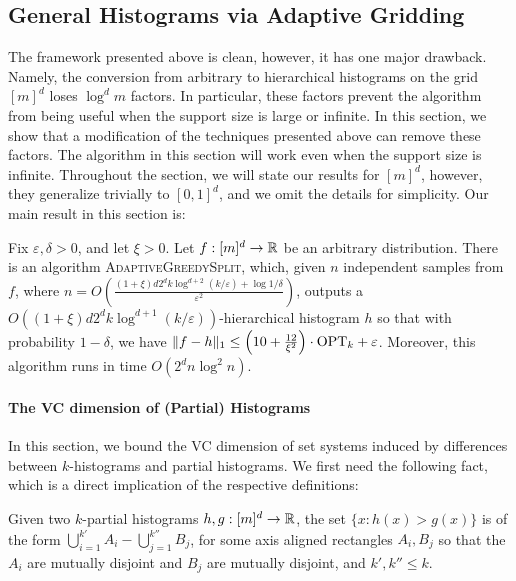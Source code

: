 \documentclass[final,12pt]{colt2018} %
\newcommand{\eps}{\varepsilon}
\begin{document}
\subsection{General Histograms via Adaptive Gridding}
The framework presented above is clean, however, it has one major drawback.
Namely, the conversion from arbitrary to hierarchical histograms on the grid $[m]^d$ loses $\log^d m$ factors. 
In particular, these factors prevent the algorithm from being useful when the support size is large or infinite.
In this section, we show that a modification of the techniques presented above can remove these factors.
The algorithm in this section will work even when the support size is infinite.
Throughout the section, we will state our results for $[m]^d$, however, they generalize trivially to $[0, 1]^d$, and we omit the details for simplicity.
Our main result in this section is:
\begin{theorem}
\label{thm:adaptive-main}
Fix $\eps, \delta > 0$, and let $\xi > 0$.
Let $f: [m]^d \to \operatorname{\mathbb{R}}$ be an arbitrary distribution.
There is an algorithm \textsc{AdaptiveGreedySplit}, which, given $n$ independent samples from $f$, where
$
n = O \left(  \frac{(1 + \xi) d 2^d k \log^{d + 2} (k / \eps) + \log 1 / \delta}{\eps^2} \right)
$,
outputs a $O((1 + \xi) d 2^d k \log^{d + 1} (k / \eps))$-hierarchical histogram $h$ so that with probability $1 - \delta$, we have
$\| f - h \|_1 \leq \left( 10 + \frac{12}{\xi^2} \right) \cdot \OPT_k + \eps$.
Moreover, this algorithm runs in time $O(2^d n \log^2 n)$.
\end{theorem}

\paragraph{The VC dimension of (Partial) Histograms}
In this section, we bound the VC dimension of set systems induced by differences between $k$-histograms and partial histograms.
We first need the following fact, which is a direct implication of the respective definitions:
\begin{fact}
\label{fact:difference-of-partials}
Given two $k$-partial histograms $h, g: [m]^d \to \operatorname{\mathbb{R}}$, the set $\{x: h(x) > g(x) \}$ is of the form $\bigcup_{i = 1}^{k'} A_i - \bigcup_{j = 1}^{k''} B_j$, for some axis aligned rectangles $A_i, B_j$ so that the $A_i$ are mutually disjoint and $B_j$ are mutually disjoint, and $k', k'' \leq k$.
\end{fact}
\end{document}
